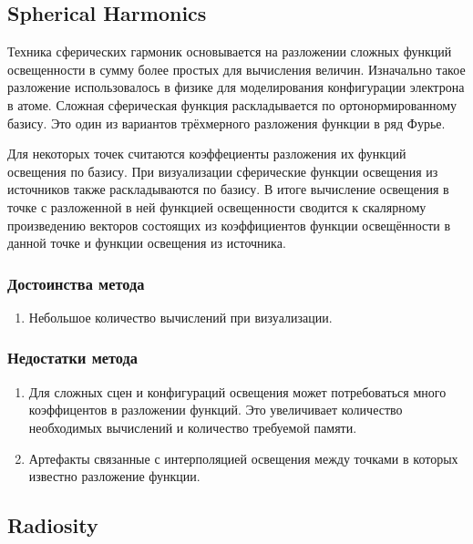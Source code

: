 \documentclass[12pt,fleqn]{article}
\begin{document}
\subsection{Spherical Harmonics}

Техника сферических гармоник основывается на разложении сложных функций освещенности в сумму более простых для вычисления величин. Изначально такое разложение использовалось в физике для моделирования конфигурации электрона в атоме. Сложная сферическая функция раскладывается по ортонормированному базису. Это один из вариантов трёхмерного разложения функции в ряд Фурье.

Для некоторых точек считаются коэффециенты разложения их функций освещения по базису. При визуализации сферические функции освещения из источников также раскладываются по базису. В итоге вычисление освещения в точке с разложенной в ней функцией освещенности сводится к скалярному произведению векторов состоящих из коэффициентов функции освещённости в данной точке и функции освещения из источника.

\subsubsection{Достоинства метода}

\begin{enumerate}

\item Небольшое количество вычислений при визуализации.

\end{enumerate}

\subsubsection{Недостатки метода}

\begin{enumerate}

\item Для сложных сцен и конфигураций освещения может потребоваться много коэффицентов в разложении функций. Это увеличивает количество необходимых вычислений и количество требуемой памяти.

\item Артефакты связанные с интерполяцией освещения между точками в которых известно разложение функции.

\end{enumerate}

\subsection{Radiosity}
\end{document}
